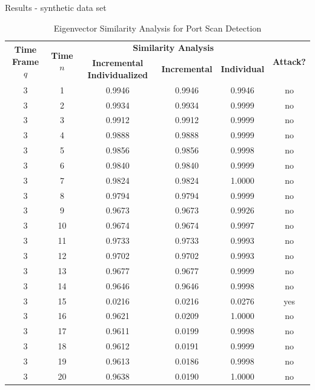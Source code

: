\documentclass[newPxFont, numfooter, sectionpages]{beamer}
\begin{document}
\begin{frame}{Results - synthetic data set}
	\begin{table}[h!]
	  \centering
	  \tiny
	  \caption{Eigenvector Similarity Analysis for Port Scan Detection}
	  \label{tab:tab5}
	  \begin{tabular}{ c c c c c c }
		\toprule
		\multirow{2}{*}{\textbf{Time Frame} $q$} &\multirow{2}{*}{\textbf{Time} $n$}   &\multicolumn{3}{c}{\textbf{Similarity Analysis}} &\multirow{2}{*}{\textbf{Attack?}}\\ 
				\hhline{~~---~}
				& &\textbf{Incremental Individualized} &\textbf{Incremental} &\textbf{Individual}\\
		\midrule
		3 &1 &0.9946 &0.9946 &0.9946 &no \\
		3 &2 &0.9934 &0.9934 &0.9999 &no \\
		3 &3 &0.9912 &0.9912 &0.9999 &no \\
		3 &4 &0.9888 &0.9888 &0.9999 &no \\
		3 &5 &0.9856 &0.9856 &0.9998 &no \\
		3 &6 &0.9840 &0.9840 &0.9999 &no \\
		3 &7 &0.9824 &0.9824 &1.0000 &no \\
		3 &8 &0.9794 &0.9794 &0.9999 &no \\
		3 &9 &0.9673 &0.9673 &0.9926 &no \\
		3 &10 &0.9674 &0.9674 &0.9997 &no \\
		3 &11 &0.9733 &0.9733 &0.9993 &no \\
		3 &12 &0.9702 &0.9702 &0.9993 &no \\
		3 &13 &0.9677 &0.9677 &0.9999 &no \\
		3 &14 &0.9646 &0.9646 &0.9998 &no \\
		3 &15 &\color{red}0.0216 &\color{red}0.0216 &\color{red}0.0276 &\color{red}yes \\
		3 &16 &0.9621 &\color{red}0.0209 &1.0000 &no \\
		3 &17 &0.9611 &\color{red}0.0199 &0.9998 &no \\
		3 &18 &0.9612 &\color{red}0.0191 &0.9999 &no \\
		3 &19 &0.9613 &\color{red}0.0186 &0.9998 &no \\
		3 &20 &0.9638 &\color{red}0.0190 &1.0000 &no \\
	    \bottomrule
	  \end{tabular}
	\end{table}	
\end{frame}
\end{document}

